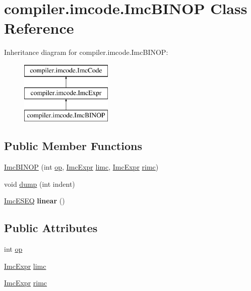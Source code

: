 \hypertarget{classcompiler_1_1imcode_1_1_imc_b_i_n_o_p}{}\section{compiler.\+imcode.\+Imc\+B\+I\+N\+OP Class Reference}
\label{classcompiler_1_1imcode_1_1_imc_b_i_n_o_p}
Inheritance diagram for compiler.\+imcode.\+Imc\+B\+I\+N\+OP\+:\begin{figure}[H]
\begin{center}
\leavevmode
\includegraphics[height=3.000000cm]{classcompiler_1_1imcode_1_1_imc_b_i_n_o_p}
\end{center}
\end{figure}
\subsection*{Public Member Functions}
\begin{DoxyCompactItemize}
\item 
\hyperlink{classcompiler_1_1imcode_1_1_imc_b_i_n_o_p_a5f3acd2146f33c40db6d7fe253a763bd}{Imc\+B\+I\+N\+OP} (int \hyperlink{classcompiler_1_1imcode_1_1_imc_b_i_n_o_p_ade3e9590d2dcb9d3e4e6b40ae6dca023}{op}, \hyperlink{classcompiler_1_1imcode_1_1_imc_expr}{Imc\+Expr} \hyperlink{classcompiler_1_1imcode_1_1_imc_b_i_n_o_p_a9e1fe1962f67c6ed03e3661b1be7aff7}{limc}, \hyperlink{classcompiler_1_1imcode_1_1_imc_expr}{Imc\+Expr} \hyperlink{classcompiler_1_1imcode_1_1_imc_b_i_n_o_p_a91fcda06e82a86fc5f0943968ade88a0}{rimc})
\item 
void \hyperlink{classcompiler_1_1imcode_1_1_imc_b_i_n_o_p_a9de35f92c54a54c94d93b46b94ea4086}{dump} (int indent)
\item 
\mbox{\label{classcompiler_1_1imcode_1_1_imc_b_i_n_o_p_a9faa5d8897f1b8cd6c8398814eeeef07}} 
\hyperlink{classcompiler_1_1imcode_1_1_imc_e_s_e_q}{Imc\+E\+S\+EQ} {\bfseries linear} ()
\end{DoxyCompactItemize}
\subsection*{Public Attributes}
\begin{DoxyCompactItemize}
\item 
int \hyperlink{classcompiler_1_1imcode_1_1_imc_b_i_n_o_p_ade3e9590d2dcb9d3e4e6b40ae6dca023}{op}
\item 
\hyperlink{classcompiler_1_1imcode_1_1_imc_expr}{Imc\+Expr} \hyperlink{classcompiler_1_1imcode_1_1_imc_b_i_n_o_p_a9e1fe1962f67c6ed03e3661b1be7aff7}{limc}
\item 
\hyperlink{classcompiler_1_1imcode_1_1_imc_expr}{Imc\+Expr} \hyperlink{classcompiler_1_1imcode_1_1_imc_b_i_n_o_p_a91fcda06e82a86fc5f0943968ade88a0}{rimc}
\end{DoxyCompactItemize}
